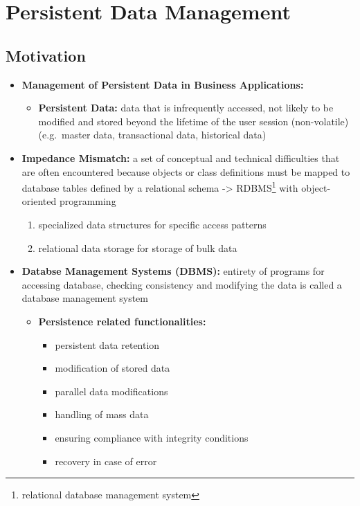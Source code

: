 \documentclass[ieeetran]{article}
\begin{document}
\pagebreak
\section{Persistent Data Management} %
\label{sec:persistent_data_management}
 
\subsection{Motivation} %
\label{sub:motivation}



\begin{itemize}
\item \textbf{Management of Persistent Data in Business Applications:}
		  
	  \begin{itemize}
	    \item \textbf{Persistent Data:} data that is infrequently accessed, not likely to be modified and stored beyond the lifetime of the user session (non-volatile) (e.g.\ master data, transactional data, historical data)
	  \end{itemize}

  \item \textbf{Impedance Mismatch:} a set of conceptual and technical difficulties that are often encountered because objects or class definitions must be mapped to database tables defined by a relational schema -> RDBMS\footnote{relational database management system} with object-oriented programming
	\begin{enumerate}
	  \item specialized data structures for specific access patterns
	\item relational data storage for storage of bulk data
	\end{enumerate}

\item \textbf{Databse Management Systems (DBMS):} entirety of programs for accessing database, checking consistency and modifying the data is called a database management system

	\begin{itemize}
	  \item \textbf{Persistence related functionalities:}
		  \begin{itemize}
		    \item persistent data retention
		\item modification of stored data
		\item parallel data modifications
			\item handling of mass data
				\item ensuring compliance with integrity conditions
					\item recovery in case of error
		  \end{itemize}


\end{itemize}
\end{itemize}
\end{document}
